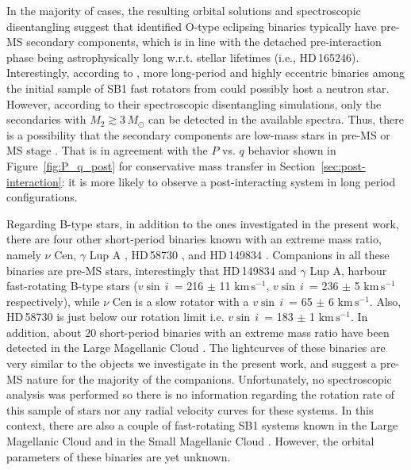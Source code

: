 \documentclass{aa}
\newcommand{\kms}{$\mathrm{km\,s^{-1}}$}
\newcommand{\vsini} {$v\sin\,i$}
\DeclareRobustCommand{\Figref}[1]{Figure~\ref{#1}}
\DeclareRobustCommand{\Secref}[1]{Section~\ref{#1}}
\begin{document}
In the majority of cases, the resulting orbital solutions and spectroscopic disentangling suggest that
  identified O-type eclipsing binaries typically have pre-MS secondary
  components, which is in line with the detached pre-interaction phase being
  astrophysically long w.r.t. stellar lifetimes (i.e., HD\,165246). Interestingly,
according to \citet{Mahy_2022}, more long-period and highly eccentric
binaries among the initial sample of SB1 fast rotators from
\citet{Britavskiy_2023} could possibly host a neutron
star. However, according to their spectroscopic disentangling simulations, only
the secondaries with  $M_2\gtrsim 3\,M_{\odot}$ can be detected in the
available spectra. Thus, there is a possibility that the secondary components are
  low-mass stars in pre-MS or MS stage \citep[e.g., HD\,15137 and HD\,165174 in][]{Mahy_2022}.
That is in agreement with the $P$ vs. $q$ behavior shown in \Figref{fig:P_q_post} for conservative mass
transfer in \Secref{sec:post-interaction}: it is more likely to observe a post-interacting system in long period configurations.


Regarding B-type stars, in addition to the ones investigated in the present work, there are four other short-period binaries known with an extreme mass ratio, namely $\nu$ Cen, $\gamma$ Lup A \citep[see,][]{Jerzykiewicz_2021}, HD\,58730 \citep{Stevens_2020}, and HD\,149834 \citep{Stassun_2021}.
Companions in all these binaries are pre-MS stars, interestingly that HD\,149834 and $\gamma$ Lup A,  harbour fast-rotating B-type stars (\vsini~= 216 $\pm$ 11 \kms, \vsini~= 236 $\pm$ 5 \kms~ respectively), while $\nu$ Cen is a slow rotator with a \vsini~=  65 $\pm$ 6 \kms.
Also, HD\,58730 is just below our rotation limit i.e. \vsini~= 183 $\pm$ 1 \kms.
In addition, about 20 short-period binaries with an extreme mass ratio have been detected in the Large Magellanic Cloud \citep[see][]{Moe_2015}. The lightcurves of these binaries are very similar to the objects we investigate in the present work, and \citeauthor{Moe_2015} suggest a pre-MS nature for the majority of the companions.
Unfortunately, no spectroscopic analysis was performed so there is no information regarding the rotation rate of this sample of stars nor any radial velocity curves for these systems.
In this context, there are also a couple of fast-rotating SB1 systems known in the Large Magellanic Cloud \citep[O-type primaries, see][]{vfts_2015_otype} and in the Small Magellanic Cloud \citep[B-type primaries, see][]{Bodensteiner_2023}. However, the orbital parameters of these binaries are yet unknown.
\end{document}
